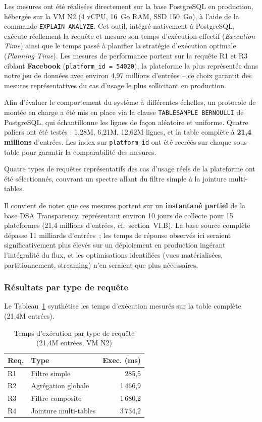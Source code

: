 \documentclass[10pt,twocolumn,a4paper]{article}
\begin{document}
Les mesures ont été réalisées directement sur la base PostgreSQL
en production, hébergée sur la VM N2 (4 vCPU, 16~Go RAM, SSD
150~Go), à l'aide de la commande \texttt{EXPLAIN ANALYZE}.
Cet outil, intégré nativement à PostgreSQL, exécute réellement
la requête et mesure son temps d'exécution effectif
(\textit{Execution Time}) ainsi que le temps passé à planifier
la stratégie d'exécution optimale (\textit{Planning Time}).
Les mesures de performance portent sur la requête R1 et R3
ciblant \textbf{Facebook} (\texttt{platform\_id = 54020}),
la plateforme la plus représentée dans notre jeu de données
avec environ 4,97 millions d'entrées -- ce choix garantit
des mesures représentatives du cas d'usage le plus
sollicitant en production.

Afin d'évaluer le comportement du système à différentes
échelles, un protocole de montée en charge a été mis en place
via la clause \texttt{TABLESAMPLE BERNOULLI} de PostgreSQL,
qui échantillonne les lignes de façon aléatoire et uniforme.
Quatre paliers ont été testés : 1,28M, 6,21M, 12,62M lignes,
et la table complète à \textbf{21,4 millions} d'entrées.
Les index sur \texttt{platform\_id} ont été recréés sur chaque
sous-table pour garantir la comparabilité des mesures.

Quatre types de requêtes représentatifs des cas d'usage réels
de la plateforme ont été sélectionnés, couvrant un spectre
allant du filtre simple à la jointure multi-tables.


Il convient de noter que ces mesures portent sur un
\textbf{instantané partiel} de la base DSA Transparency,
représentant environ 10 jours de collecte pour 15 plateformes
(21,4 millions d'entrées, cf.\ section~VI.B). La base
source complète dépasse 11 milliards d'entrées~; les temps
de réponse observés ici seraient significativement plus
élevés sur un déploiement en production ingérant l'intégralité
du flux, et les optimisations identifiées (vues matérialisées,
partitionnement, streaming) n'en seraient que plus nécessaires.

\subsubsection{Résultats par type de requête}

Le Tableau~\ref{tab:query-perf} synthétise les temps
d'exécution mesurés sur la table complète (21,4M entrées).

\begin{table}[H]
\centering
\caption{Temps d'exécution par type de requête (21,4M entrées,
VM N2)}
\label{tab:query-perf}
\footnotesize
\begin{tabular}{llr}
\hline
\textbf{Req.} & \textbf{Type} & \textbf{Exec. (ms)} \\
\hline
R1 & Filtre simple         &    285{,}5 \\
R2 & Agrégation globale    & 1\,466{,}9 \\
R3 & Filtre composite      & 1\,680{,}2 \\
R4 & Jointure multi-tables & 3\,734{,}2 \\
\hline
\end{tabular}
\end{table}
\end{document}
